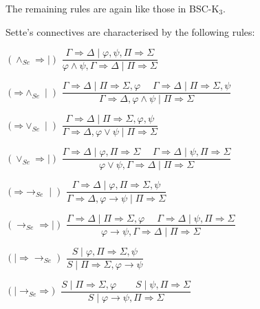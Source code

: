 \documentclass[11pt,a4paper,titlepage]{article}
\theoremstyle{definition}
\newcommand{\3}{\vspace{.3in}}
\newcommand{\2}{\vspace{.2in}}
\newcommand{\1}{\vspace{.1in}}
\newcommand{\5}{\vspace{.05in}}
\begin{document}
The remaining rules are again like those in BSC-K$_3$. 

\1

Sette's connectives are characterised by the following rules:

\begin{flushleft}
		$(\mathord{\wedge_{\mathit{Se}}}\mathord{\Rightarrow\mid})$  $\dfrac{
			\Gamma \Rightarrow \Delta \mid \varphi, \psi, \Pi\Rightarrow\Sigma}{\varphi\wedge\psi, \Gamma
			\Rightarrow \Delta \mid \Pi\Rightarrow\Sigma}$
\end{flushleft}	\begin{flushleft}
$(\mathord{\Rightarrow}\mathord{\wedge_{\mathit{Se}}\mid})$  $\dfrac{\Gamma
			\Rightarrow \Delta \mid \Pi\Rightarrow\Sigma, \varphi \;\quad
			\Gamma\Rightarrow \Delta \mid \Pi\Rightarrow\Sigma, \psi}{\Gamma \Rightarrow \Delta,
			\varphi\wedge\psi \mid \Pi\Rightarrow\Sigma}$
\end{flushleft}
	
\begin{flushleft}
	 $(\mathord{\Rightarrow}\mathord{\vee_{\mathit{Se}}\mid})$ $\dfrac{\Gamma
			\Rightarrow \Delta \mid \Pi\Rightarrow\Sigma, \varphi,\psi } {\Gamma\Rightarrow \Delta,
			\varphi\vee\psi \mid \Pi\Rightarrow\Sigma}$
\end{flushleft}
		
\begin{flushleft}
			 $(\mathord{\vee_{\mathit{Se}}}\mathord{\Rightarrow\mid})$  $\dfrac{\Gamma
			\Rightarrow \Delta \mid \varphi, \Pi\Rightarrow\Sigma \;\quad \Gamma
			\Rightarrow \Delta \mid \psi, \Pi\Rightarrow\Sigma}{\varphi\vee\psi,
			\Gamma\Rightarrow \Delta \mid\Pi\Rightarrow\Sigma}$
\end{flushleft}
	
\begin{flushleft}
	 $(\mathord{\Rightarrow}\mathord{\rightarrow_{\mathit{Se}}\mid})$ $\dfrac{\Gamma
			\Rightarrow \Delta \mid \varphi, \Pi\Rightarrow\Sigma, \psi}{\Gamma\Rightarrow\Delta, \varphi\rightarrow\psi \mid \Pi\Rightarrow\Sigma}$
\end{flushleft} \begin{flushleft}
$(\mathord{\rightarrow_{\mathit{Se}}}\mathord{\Rightarrow\mid})$ $\dfrac{\Gamma
			\Rightarrow \Delta \mid \Pi\Rightarrow\Sigma, \varphi \;\quad \Gamma\Rightarrow\Delta \mid \psi,
			\Pi \Rightarrow \Sigma } {\varphi\rightarrow\psi, \Gamma
			\Rightarrow \Delta \mid \Pi\Rightarrow\Sigma}$
\end{flushleft}
	
\begin{flushleft}
	 $(\mathord{\mid\Rightarrow}\mathord{\rightarrow_{Se}})$ $\dfrac{S \mid \varphi, \Pi\Rightarrow\Sigma, \psi}{S \mid \Pi\Rightarrow\Sigma, \varphi\rightarrow\psi}$
\end{flushleft} \begin{flushleft}
$(\mathord{\mid\rightarrow_{Se}}\mathord{\Rightarrow})$ $\dfrac{S \mid \Pi\Rightarrow\Sigma, \varphi \qquad S \mid \psi,
		\Pi \Rightarrow \Sigma } {S \mid \varphi\rightarrow\psi, \Pi\Rightarrow\Sigma}$
\end{flushleft}
\end{document}
